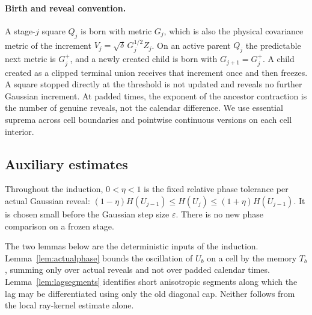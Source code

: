 \documentclass[11pt]{article}
\theoremstyle{definition}
\theoremstyle{remark}
\numberwithin{equation}{section}
\begin{document}
\paragraph{Birth and reveal convention.}
A stage-$j$ square $Q_j$ is born with metric $G_j$, which is also the
physical covariance metric of the increment $V_j=\sqrt\delta\,G_j^{1/2}Z_j$.
On an active parent $Q_j$ the predictable next metric is $G_j^+$,
and a newly created child is born with $G_{j+1}=G_j^+$. A child created
as a clipped terminal union receives that increment once and then
freezes. A square stopped directly at the threshold is not updated
and reveals no further Gaussian increment. At padded times, the
exponent of the ancestor contraction is the number of genuine
reveals, not the calendar difference. We use essential suprema across
cell boundaries and pointwise continuous versions on each cell
interior.


\subsection{Auxiliary estimates}
\label{not:relativephase}
Throughout the induction, $0<\eta<1$ is the fixed relative
phase tolerance per actual Gaussian reveal:
$(1-\eta)H(U_{j-1})\le H(U_j)\le(1+\eta)H(U_{j-1})$.
It is chosen small before the Gaussian step size $\varepsilon$.
There is no new phase comparison on a frozen stage.

The two lemmas below are the deterministic inputs of the induction.
Lemma~\ref{lem:actualphase} bounds the oscillation of $U_b$ on a cell
by the memory $T_b$, summing only over actual reveals and not over
padded calendar times. Lemma~\ref{lem:lagsegments} identifies short
anisotropic segments along which the lag may be differentiated using
only the old diagonal cap. Neither follows from the local ray-kernel
estimate alone.
\end{document}
